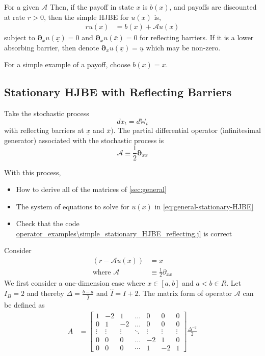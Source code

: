 \documentclass[11pt]{article}
\newcommand{\D}[1][]{\ensuremath{\boldsymbol{\partial}_{#1}}}
\newcommand{\W}{\ensuremath{\mathbb{W}}}
\newcommand{\A}{\ensuremath{\mathcal{A}}}
\begin{document}
For a given $\A$ Then, if the payoff in state $x$ is $b(x)$, and payoffs are discounted at rate $r > 0$, then the simple HJBE for $u(x)$ is,
\begin{align}
r u(x) &= b(x) + \A u(x)\label{eq:general-stationary-HJBE}
\end{align}
subject to $\D[x]u(\underline{x}) = 0$ and $\D[x]u(\bar{x}) = 0$ for reflecting barriers.  If it is a lower absorbing barrier, then denote $\D[x]u(\underline{x}) = \underline{u}$ which may be non-zero.

For a simple example of a payoff, choose $b(x) = x$.

\subsection{Stationary HJBE with Reflecting Barriers}
Take the stochastic process
$$
d x_t = d \W_t
$$
with reflecting barriers at $\underline{x}$ and $\bar{x})$.  The partial differential operator (infinitesimal generator) associated with the stochastic process is
$$
	\A \equiv \frac{1}{2}\D[xx]
$$

With this process,
\begin{itemize}
	\item How to derive all of the matrices of \cref{sec:general}
	\item The system of equations to solve for $u(x)$ in \cref{eq:general-stationary-HJBE}
	\item Check that the code \url{operator_examples\simple_stationary_HJBE_reflecting.jl} is correct
\end{itemize}
Consider
\begin{align}
(r- \A u(x)) &= x\label{HJBE_reflecting_barriers_PDE}\\
\text{where }\A&\equiv \frac{1}{2}\partial_{xx}
\end{align}
We first consider a one-dimension case where $x\in [a, b]$ and $a<b\in R$. Let $I_B = 2$ and thereby $\Delta  = \frac{b-a}{\hat{I}}$ and $\hat{I} = I+2$. The matrix form of operator $\A$ can be defined as
\begin{align}
A &= \begin{bmatrix}
1&-2&1&\dots&0&0&0\\
0&1&-2&\dots&0&0&0\\
\vdots&\vdots&\vdots&\ddots&\vdots&\vdots&\vdots\\
0&0&0&\dots&-2&1&0\\
0&0&0&\cdots&1&-2&1
\end{bmatrix}\frac{\Delta^{-2}}{2}\nonumber
\end{align}
\end{document}
